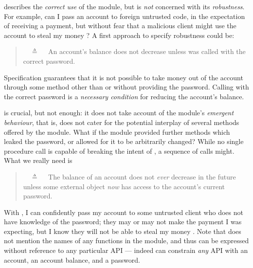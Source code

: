     \vspace{.05in}
 
\Scorrect  describes  {the \emph{correct use} of the module, but is \emph{not} concerned with its \emph{robustness}.}
{For example, can I pass an account to foreign untrusted code, in the expectation of receiving a payment,
but without fear that a malicious client might use the account to steal my money \cite{ELang}?}
 A first approach to specify robustness could be:
 

\begin{quote}
\SrobustA\ \ $\triangleq$ \ \ An account's balance does not decrease unless  was called 
with the correct password.
\end{quote}

Specification \SrobustA %
{guarantees} that it is not possible to  take money out of the account through some method other than 
{or without providing the password}.
  Calling    with the  correct password is 
a \emph{necessary condition} for reducing the account's  balance.

\SrobustA is  crucial, but  not   enough:
it does not take  account of the module's \emph{emergent behaviour},
{that is, does not cater for the potential interplay of several methods offered by the module.}
 What if the module provided further methods which leaked the password,  
 {or allowed for it to be arbitrarily changed}?
{ While no single procedure call is capable of breaking the intent of \SrobustA, a sequence of calls might.}
{What} we really need is
 \begin{quote}
\SrobustB\ \ $\triangleq$ \ \ The balance of an account does not {\emph{ever}} decrease in the future unless some external 
object  {\emph{now}} has access to the account's current password.
\end{quote}
With \SrobustB, I can confidently pass my account to some untrusted client who
 does not have
 knowledge of the password; they may or may not make the payment I was expecting, but I
 know they will not  {be able to} steal my money \cite{ooToSecurity,miller-esop2013}.
 Note that \SrobustB  does not mention
 the names of any functions in the module, and 
 thus can be expressed without reference to any particular API ---
 indeed \SrobustB can constrain \emph{any} API with an account, an account
 balance, and a password.

\vspace{.04in}
 
